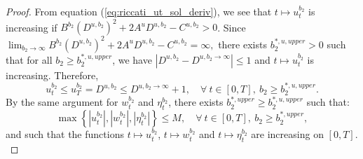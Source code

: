 \documentclass[11pt]{article}
\begin{document}
\begin{proof}
	From equation (\ref{eq:riccati_ut_sol_deriv}), we see that $t \mapsto u_t^{b_2}$ is increasing if $B^{b_2} (D^{u,b_2})^2 + 2 A^u D^{u,b_2} - C^{u,b_2} > 0$. Since 
	$\lim_{b_2 \to \infty} B^{b_2} (D^{u,b_2})^2 + 2 A^u D^{u,b_2} - C^{u,b_2} = \infty,$ there exists $b_2^{*,u,upper} >0$ such that for all $b_2 \geq b_2^{*,u,upper}$, we have $|D^{u,b_2} -D^{u,b_2 \to \infty} | \leq 1$ and $t \mapsto u_t^{b_2}$ is increasing.
	Therefore,
	\begin{equation*}
	u_t^{b_2}\leq u_T^{b_2} = D^{u,b_2} \leq D^{u,b_2 \to \infty} + 1, \quad \forall \  t\in[0,T],\ b_2 \geq b_2^{*,u,upper}.
	\label{eq:u_t_bound}
	\end{equation*}
	By the same argument for $w_t^{b_2}$ and $\eta_t^{b_2}$, there exists $b_2^{*,upper} \geq b_2^{*,u,upper}$ such that:
	\begin{equation}
	\max \left\{ \left\vert u_t^{b_2} \right\vert , \left\vert w_t^{b_2} \right\vert, \left\vert \eta_t^{b_2} \right\vert \right\} \leq M, \quad \forall \  t\in[0,T],\ b_2 \geq b_2^{*,upper},
	\label{eq:ut_wt_upper_bound_b2_infty}
	\end{equation}
	and such that the functions $t \mapsto u_t^{b_2}$, $t \mapsto w_t^{b_2}$ and $t \mapsto \eta_t^{b_2}$ are increasing on $[0,T]$. \\


\end{proof}
\end{document}
